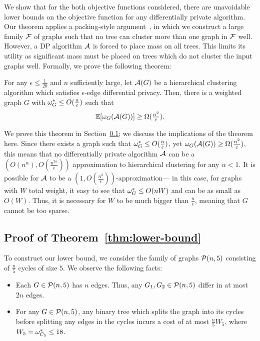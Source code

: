 We show that for the both objective functions considered, there are unavoidable lower bounds on the objective function for any differentially private algorithm.
Our theorem applies a packing-style argument~\citep{hardt2010geometry}, in which we construct a large family $\mathcal{F}$ of graphs such that no tree can cluster more than one graph in $\mathcal{F}$ well. However, a DP algorithm $\mathcal{A}$ is forced to place mass on all trees. This limits its utility as significant mass must be placed on trees which do not cluster the input graphs well. Formally, we prove the following theorem:

\begin{thm}\label{thm:lower-bound}
For any $\epsilon \leq \frac{1}{20}$ and $n$ sufficiently large, let $\mathcal{A}(G)$ be a hierarchical clustering algorithm which satisfies $\epsilon$-edge differential privacy. Then, there is a weighted graph $G$ with $\omega_G^* \leq O(\frac{n}{\varepsilon})$ such that 
\[
    \operatorname{\mathbb{E}}[\omega_{G}(\mathcal{A}(G))] \geq \Omega(\tfrac{n^2}{\varepsilon}).
\]
\end{thm}

We prove this theorem in Section~\ref{sec:lb-proof}; we discuss the implications of the theorem here. Since there exists a graph such that $\omega_G^* \leq O(\frac{n}{\varepsilon})$, yet $\omega_G(\mathcal{A}(G)) \geq \Omega(\frac{n^2}{\varepsilon})$, this means that no differentially private algorithm $\mathcal{A}$ can be a $(O(n^{\alpha}), O(\frac{n^{2\alpha}}{\epsilon}))$ approximation to hierarchical clustering for any $\alpha < 1$. It is possible for $\mathcal{A}$ to be a $(1, O(\frac{n^2}{\epsilon}))$-approximation--- in this case, for graphs with $W$ total weight, it easy to see that $\omega_G^* \leq O(nW)$ and can be as small as $O(W)$. Thus, it is necessary for $W$ to be much bigger than $\frac{n}{\epsilon}$, meaning that $G$ cannot be too sparse.

\subsection{Proof of Theorem~\ref{thm:lower-bound}}\label{sec:lb-proof}

To construct our lower bound, we consider the family of graphs $\mathcal{P}(n, 5)$ consisting of $\frac{n}{5}$ cycles of size $5$. We observe the following facts:
\begin{itemize}
    \item Each $G \in \mathcal{P}(n, 5)$ has $n$ edges. Thus, any $G_1, G_2 \in \mathcal{P}(n, 5)$ differ in at most $2n$ edges.
    \item For any $G \in \mathcal{P}(n, 5)$, any binary tree which splits the graph into its cycles before splitting any edges in the cycles incurs a cost of at most $\frac{n}{5} W_5$, where $W_5 = \omega_{C_5}^* \leq 18$.
\end{itemize}


